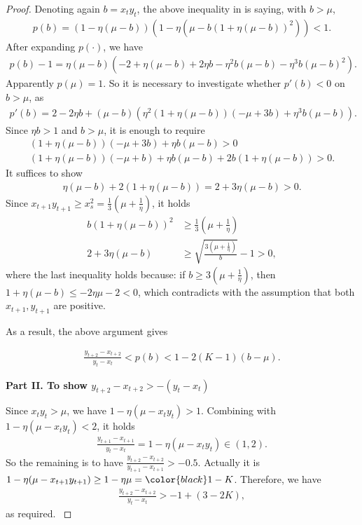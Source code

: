 \documentclass{article}
\theoremstyle{plain}
\theoremstyle{remark}
\newcommand{\red}[1]{{\color{black}#1}}
\begin{document}
\begin{proof}
Denoting again $b=x_t y_t$, the above inequality in  is saying, with $b>\mu$,
\begin{align}
    p(b)=\left(1-\eta\left(\mu-b\right)\right)
    \left(1-\eta\left(\mu-b\left(1+\eta\left(\mu-b\right)\right)^2\right)\right)<1.
\end{align}
After expanding $p(\cdot)$, we have
\begin{align*}
    p(b)-1=\eta \left(\mu-b\right)
    \left(
    -2+\eta\left(\mu-b\right)+2\eta b-\eta^2 b\left(\mu-b\right)-\eta^3 b\left(\mu-b\right)^2
    \right).
\end{align*}
Apparently $p(\mu)=1$. So it is necessary to investigate whether $p'(b)<0$ on $b>\mu$, as
\begin{align*}
    p'(b)=2-2\eta b+\left(\mu-b\right)
    \left(
    \eta^2\left(1+\eta\left(\mu-b\right)\right)\left(-\mu+3b\right)+\eta^3 b\left(\mu-b\right)
    \right).
\end{align*}
Since $\eta b>1$ and $b>\mu$, it is enough to require
\begin{gather*}
    \left(1+\eta\left(\mu-b\right)\right)\left(-\mu+3b\right)+\eta b\left(\mu-b\right)>0\\
    (1+\eta(\mu-b))(-\mu+b)+\eta b(\mu-b)+2b(1+\eta(\mu-b))>0.
\end{gather*}
It suffices to show
\begin{align}
    \eta (\mu-b)+2(1+\eta(\mu-b))=2+3\eta(\mu-b)>0.
\end{align}
Since $x_{t+1} y_{t+1}\ge x_s^2=\frac{1}{3}\left(\mu+\frac{1}{\eta}\right)$, it holds
\begin{align*}
    b\left(1+\eta(\mu-b)\right)^2
    &\ge\frac{1}{3}\left(\mu+\frac{1}{\eta}\right) \\
    2+3\eta(\mu-b)
    &\ge \sqrt{\frac{3\left(\mu+\frac{1}{\eta}\right)}{b}}-1>0,
\end{align*}
where the last inequality holds because: if $b\ge 3\left(\mu+\frac{1}{\eta}\right)$, then $1+\eta(\mu-b)\le -2\eta\mu-2<0$, which contradicts with the assumption that both $x_{t+1}, y_{t+1}$ are positive. \red{As a result, the above argument gives

\begin{align}
    \frac{y_{t+2}-x_{t+2}}{y_t-x_t} < p(b)< 1-2(K-1)(b-\mu).
    \label{eq:xydiff_rate3}
\end{align}
}

\textbf{Part II. To show $y_{t+2}-x_{t+2}>-(y_t-x_t)$}

Since $x_t y_t>\mu$, we have $1-\eta(\mu-x_t y_t)>1$. Combining with $1-\eta(\mu-x_t y_t)<2$, it holds
\begin{align*}
    \frac{y_{t+1}-x_{t+1}}{y_t-x_t}=1-\eta(\mu-x_t y_t)\in(1,2).
\end{align*}
So the remaining is to have $\frac{y_{t+2}-x_{t+2}}{y_{t+1}-x_{t+1}}>-0.5$. Actually it is $1-\eta(\mu-x_{t+1}y_{t+1})\ge 1-\eta\mu=\red{1-K}$. 
\red{
Therefore, we have 
\begin{align}
    \frac{y_{t+2}-x_{t+2}}{y_t-x_t}> -1 +(3-2K),
    \label{eq:xydiff_rate4}
\end{align}
as required.
}


\end{proof}
\end{document}
